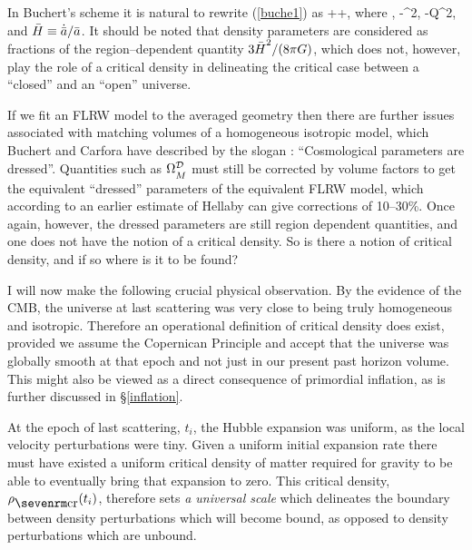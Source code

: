 \documentclass[12pt]{article}
\begin{document}
In Buchert's scheme it is natural to rewrite (\ref{buche1}) as
\beq
\OmDm+\OmDR+,\label{eqn0}
\eeq
where
\beq
\OmDm{},\qquad
\OmDR\equiv-{\bH^2},\qquad
\OmDQ\equiv-{{\cal Q}\bH^2},
\label{undress1}\eeq
and $\bH\equiv\dot\ab/\ab$. It should be noted that density parameters
are considered as fractions of the region--dependent quantity
$3\bH^2/(8\pi G)$, which does not, however, play the role of a critical
density in delineating the critical case between a ``closed'' and an ``open''
universe.

If we fit an FLRW model to the averaged geometry then there are further
issues associated with matching volumes of a homogeneous isotropic model,
which Buchert and Carfora have described by the slogan \cite{BC}:
``Cosmological parameters are dressed''. Quantities such as $\OmDm$ must still
be corrected by volume factors to get the equivalent ``dressed'' parameters
of the equivalent FLRW model, which according to an earlier estimate of
Hellaby \cite{Hellaby} can give corrections of 10--30\%. Once again, however,
the dressed parameters are still region dependent quantities, and one does
not have the notion of a critical density. So is there a notion of critical
density, and if so where is it to be found?

I will now make the following crucial physical observation. By the evidence
of the CMB, the universe at last scattering was very close to being truly
homogeneous and isotropic. Therefore
an operational definition of critical density does exist, provided we assume
the Copernican Principle and accept that the universe was globally smooth
at that epoch and not just in our present past horizon volume. This might
also be viewed as a direct consequence of primordial inflation, as is
further discussed in \S\ref{inflation}.

At the epoch of last scattering, $t_i$, the Hubble expansion was uniform, as
the local velocity perturbations were tiny. Given a uniform initial expansion
rate there must have existed a uniform critical density of matter required
for gravity to be able to eventually bring that expansion to zero. This
critical density, $\rhcr(t_i)$, therefore sets {\em a universal
scale} which delineates the boundary between density perturbations which
will become bound, as opposed to density perturbations which are unbound.
\end{document}
